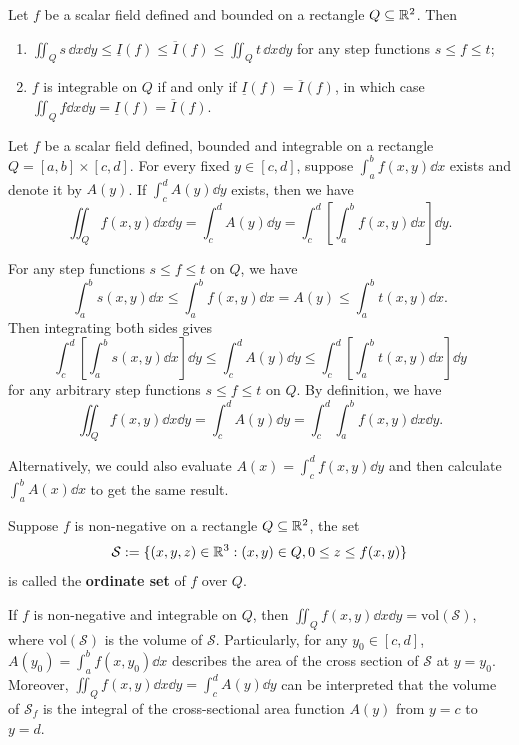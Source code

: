 \begin{theoremenv}
    Let $f$ be a scalar field defined and bounded on a rectangle $Q\subseteq \mathbb{R}^2$. Then
    \begin{enumerate}
        \item $\displaystyle \iint_Q s\, \dd x \dd y \leq \underline{I}(f) \leq \overline{I}(f) \leq \iint_Q t\, \dd x \dd y$ for any step functions $s \le f \le t$;
        \item $f$ is integrable on $Q$ if and only if $\underline{I}(f) = \overline{I}(f)$, in which case $\displaystyle \iint_Q f \dd x \dd y = \underline{I}(f) = \overline{I}(f)$.
    \end{enumerate}
\end{theoremenv}
\begin{theoremenv}
    Let $f$ be a scalar field defined, bounded and integrable on a rectangle $Q = [a,b] \times [c,d]$. For every fixed $y \in [c,d]$, suppose $\displaystyle \int_a^b f(x,y) \dd x$ exists and denote it by $A(y)$. If $\displaystyle \int_c^d A(y) \dd y$ exists, then we have
    $$
    \iint_Q f(x,y) \dd x \dd y = \int_c^d A(y) \dd y = \int_c^d \left[ \int_a^b f(x,y) \dd x \right] \dd y.
    $$
\end{theoremenv}
\begin{proofenv}
    For any step functions $s\le f \le t$ on $Q$, we have
    \[
    \int_a^b s(x,y) \dd x \leq \int_a^b f(x,y) \dd x = A(y) \leq \int_a^b t(x,y) \dd x.
    \]
    Then integrating both sides gives
    \[
    \int_c^d \left[ \int_a^b s(x,y) \dd x \right] \dd y \leq \int_c^d A(y) \dd y \leq \int_c^d \left[ \int_a^b t(x,y) \dd x \right] \dd y
    \]
    for any arbitrary step functions $s\le f \le t$ on $Q$. By definition, we have $$\displaystyle \iint_Q f(x,y) \dd x \dd y = \int_c^d A(y) \dd y = \int_c^d \int_a^b f(x,y) \dd x \dd y.$$
\end{proofenv}
\begin{remarkenv}
    Alternatively, we could also evaluate $A(x) \displaystyle = \int_c^d f(x,y) \dd y$  and then calculate $\displaystyle \int_a^b A(x) \dd x$ to get the same result.
\end{remarkenv}
\begin{definitionenv}
    Suppose $f$ is non-negative on a rectangle $Q\subseteq \mathbb{R}^2$, the set
    $$
    \mathcal{S} := \{(x,y,z) \in \mathbb{R}^3 : (x,y) \in Q, 0 \leq z \leq f(x,y)\}
    $$
    is called the \textbf{ordinate set} of $f$ over $Q$.
\end{definitionenv}
\begin{remarkenv}
    If $f$ is non-negative and integrable on $Q$, then $\displaystyle \iint_Q f(x,y) \dd x \dd y = \text{vol}(\mathcal{S})$, where $\text{vol}(\mathcal{S})$ is the volume of $\mathcal{S}$. Particularly, for any $y_0 \in [c,d]$, $\displaystyle A(y_0) = \int_a^b f(x,y_0) \dd x$ describes the area of the cross section of $\mathcal{S}$ at $y=y_0$. Moreover, $\displaystyle \iint_Q f(x,y) \dd x \dd y = \int_c^d A(y) \dd y$ can be interpreted that the volume of $\mathcal{S}_f$ is the integral of the cross-sectional area function $A(y)$ from $y=c$ to $y=d$. 
\end{remarkenv}
